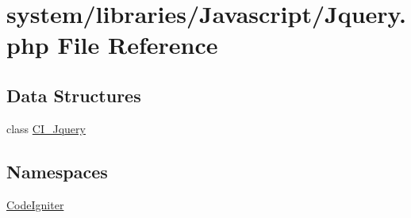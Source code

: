 \hypertarget{_jquery_8php}{}\section{system/libraries/\+Javascript/\+Jquery.php File Reference}
\label{_jquery_8php}
\subsection*{Data Structures}
\begin{DoxyCompactItemize}
\item 
class \mbox{\hyperlink{class_c_i___jquery}{C\+I\+\_\+\+Jquery}}
\end{DoxyCompactItemize}
\subsection*{Namespaces}
\begin{DoxyCompactItemize}
\item 
 \mbox{\hyperlink{namespace_code_igniter}{Code\+Igniter}}
\end{DoxyCompactItemize}
